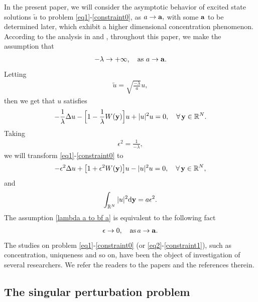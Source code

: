 \documentclass[10pt, reqno]{amsart}
\numberwithin{equation}{section}
\theoremstyle{definition}
\begin{document}
\smallskip
In the present paper,
we will consider the asymptotic behavior of excited state solutions $\tilde u$ to problem \eqref{eq1}-\eqref{constraint0}, as $a \to {\bf a}, $ with some ${\bf a}$ to be determined later, which exhibit a higher dimensional concentration phenomenon. According to the analysis in \cite{Zhouyang} and \cite{Luo}, throughout this paper, we make the assumption that
\begin{align} \label{lambda a to bf a}
-\lambda \rightarrow + \infty, \quad \text{as $a \to {\bf a} $}.
\end{align}
Letting
\begin{align*}
\tilde u = \sqrt{\frac{-\lambda} {a} } u,
\end{align*}
then we get that $ u $ satisfies
\begin{align*}
- \frac 1 \lambda \Delta u - \Big[1- \frac 1 \lambda W({\bf y}) \Big] u + | u|^2 u = 0,
\quad \forall\,{\bf y} \in \mathbb{R}^N.
\end{align*}
Taking
\begin{align}
\epsilon^2 = \frac 1{-\lambda},
\label{epsilon}
\end{align}
 we will transform \eqref{eq1}-\eqref{constraint0} to
\begin{align} \label{eq2}
- \epsilon^2 \Delta u +\big[1+ \epsilon^2 W({\bf y}) \big]u - | u|^2 u = 0,
\quad \forall\,{\bf y} \in \mathbb{R}^N,
\end{align}
 and
\begin{align} \label{constraint1}
\int_{{\mathbb R}^N} | u|^2 {\mathrm d} {\bf y}=a \epsilon^2.
\end{align}
The assumption \eqref{lambda a to bf a} is equivalent to the following fact
\begin{align}
\epsilon \to 0, \quad \text{as\,$a \to {\bf a} $}.
\label{epsilonto0}
\end{align}
 The studies on problem \eqref{eq1}-\eqref{constraint0} (or \eqref{eq2}-\eqref{constraint1}), such as concentration, uniqueness and so on, have been the object of investigation of several researchers. We refer the readers to the papers \cite{Guoqing-chunhua, Zhouyang, Guo JMPA, Guo-luo-peng, Luo, Pistoia} and the references therein.


\smallskip
\subsection{ The singular perturbation problem}\label{Section1.2}\
\end{document}
